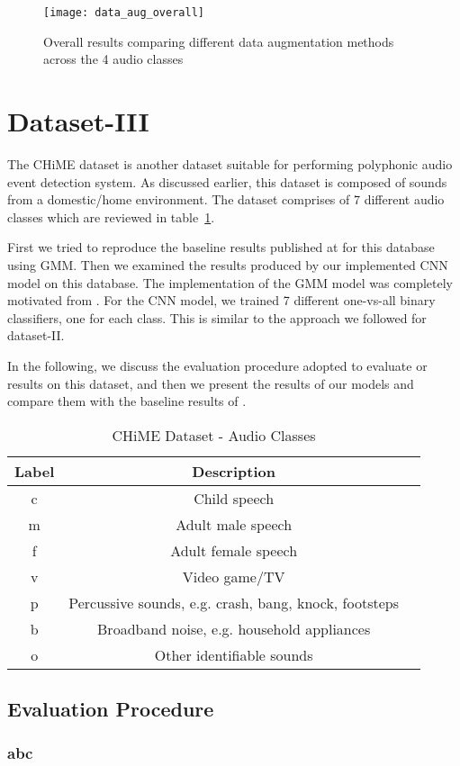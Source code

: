 \begin{figure}[!htb] 
\centering 
\texttt{[image: data\_aug\_overall]}
\caption[Overall results comparing different data augmentation methods across the 4 audio classes]{Overall results comparing different data augmentation methods across the 4 audio classes}
\label{fig:data_aug_overall} 
\end{figure}


\section{Dataset-III}

The CHiME dataset is another dataset suitable for performing polyphonic audio event detection system. As discussed earlier, this dataset is composed of sounds from a domestic/home environment. The dataset comprises of 7 different audio classes which are reviewed in table~\ref{tab:audio_classes_db3}. 

First we tried to reproduce the baseline results published at \cite{foster2015chime} for this database using GMM. Then we examined the results produced by our implemented CNN model on this database. The implementation of the GMM model was completely motivated from \cite{foster2015chime}. For the CNN model, we trained 7 different one-vs-all binary classifiers, one for each class. This is similar to the approach we followed for dataset-II. 

In the following, we discuss the evaluation procedure adopted to evaluate or results on this dataset, and then we present the results of our models and compare them with the baseline results of \cite{foster2015chime}. 

\begin{table}[tb]
\caption[CHiME Dataset - Audio Classes]{CHiME Dataset - Audio Classes}
\label{tab:audio_classes_db3}
\centering
\begin{tabular}{ccc}
\toprule
Label & Description  \\
\midrule
c	& Child speech\\
m	& Adult male speech\\
f & Adult female speech\\
v 	& Video game/TV\\
p & Percussive sounds, e.g. crash, bang, knock, footsteps\\
b & Broadband noise, e.g. household appliances\\
o & Other identifiable sounds\\
\bottomrule 
\end{tabular}
\end{table}

\subsection{Evaluation Procedure}
\subsubsection{abc}